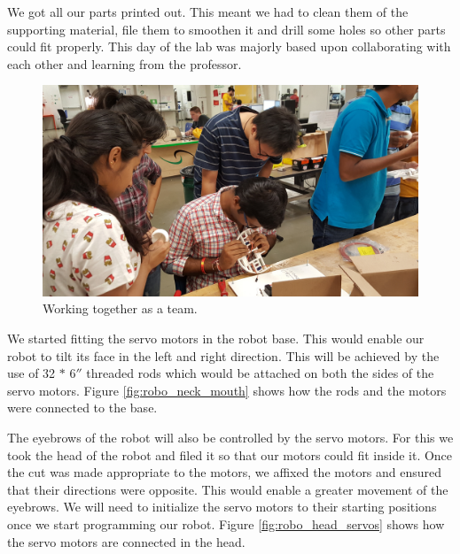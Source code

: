 \documentclass[index=totoc,hyperref,openany]{labbook} %
\begin{document}
We got all our parts printed out. This meant we had to clean them of the supporting material, file them to smoothen it and drill some holes so other parts could fit properly. This day of the lab was majorly based upon collaborating with each other and learning from the professor.

\begin{figure}[H] %
\begin{center}
\includegraphics[width=0.4\linewidth]{work_in_progress}
\end{center}
\caption{Working together as a team.}
\label{fig:work_in_progress}
\end{figure}


{\let\clearpage\relax {}}

We started fitting the servo motors in the robot base. This would enable our robot to tilt its face in the left and right direction. This will be achieved by the use of 32 $*$ 6$''$ threaded rods which would be attached on both the sides of the servo motors. Figure \ref{fig:robo_neck_mouth} shows how the rods and the motors were connected to the base.

The eyebrows of the robot will also be controlled by the servo motors. For this we took the head of the robot and filed it so that our motors could fit inside it. Once the cut was made appropriate to the motors, we affixed the motors and ensured that their directions were opposite. This would enable a greater movement of the eyebrows. We will need to initialize the servo motors to their starting positions once we start programming our robot. Figure \ref{fig:robo_head_servos} shows how the servo motors are connected in the head.
\end{document}
